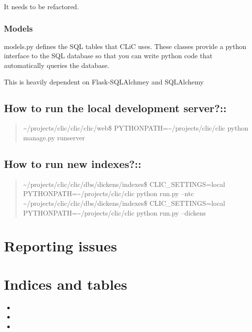 \documentclass[letterpaper,10pt,english]{sphinxmanual}
\begin{document}
It needs to be refactored.


\subsection{Models}
\label{apidoc:models}\label{apidoc:module-web.models}
models.py defines the SQL tables that CLiC uses. These classes
provide a python interface to the SQL database so that you can write python
code that automatically queries the database.

This is heavily dependent on Flask-SQLAlchmey and SQLAlchemy


\section{How to run the local development server?::}
\label{apidoc:how-to-run-the-local-development-server}\begin{quote}

\textasciitilde{}/projects/clic/clic/clic/web\$ PYTHONPATH=\textasciitilde{}/projects/clic/clic python manage.py runserver
\end{quote}


\section{How to run new indexes?::}
\label{apidoc:how-to-run-new-indexes}\begin{quote}

\textasciitilde{}/projects/clic/clic/dbs/dickens/indexes\$ CLIC\_SETTINGS=local PYTHONPATH=\textasciitilde{}/projects/clic/clic python run.py --ntc
\textasciitilde{}/projects/clic/clic/dbs/dickens/indexes\$ CLIC\_SETTINGS=local PYTHONPATH=\textasciitilde{}/projects/clic/clic python run.py --dickens
\end{quote}


\chapter{Reporting issues}
\label{index:reporting-issues}

\chapter{Indices and tables}
\label{index:indices-and-tables}\begin{itemize}
\item {} 

\item {} 

\item {} 

\end{itemize}
\end{document}

